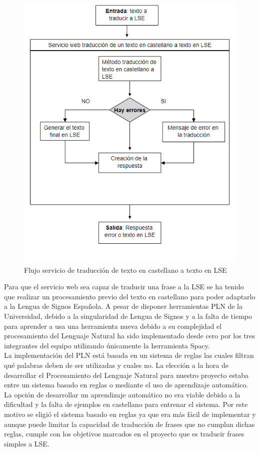 \begin{figure}[]
	\centering
	\includegraphics[width=1\textwidth]{Imagenes/Fuentes/Text2LSE/FlujoTextoLSE.png}
	\caption{ Flujo servicio de traducción de texto en castellano a texto en LSE }
	\label {fig: imgFlujoFlujoTextoLSE}
\end{figure}

Para que el servicio web sea capaz de traducir una frase a la LSE se ha tenido que realizar un procesamiento previo del texto en castellano para poder adaptarlo a la Lengua de Signos Española. A pesar de disponer herramientas PLN de la Universidad, debido a la singularidad de Lengua de Signos y a la falta de tiempo para aprender a usa una herramienta nueva debido a su complejidad el procesamiento del Lenguaje Natural ha sido implementado desde cero por los tres integrantes del equipo utilizando únicamente la herramienta Spacy. \\


La implementación del PLN está basada en un sistema de reglas las cuales filtran qué palabras deben de ser utilizadas y cuales no. La elección a la hora de desarrollar el Procesamiento del Lenguaje Natural para nuestro proyecto estaba entre un sistema basado en reglas o mediante el uso de aprendizaje automático. La opción de desarrollar un aprendizaje automático no era viable debido a la dificultad y la falta de ejemplos en castellano para entrenar el sistema. Por este motivo se eligió el sistema basado en reglas ya que era más fácil de implementar y aunque puede limitar la capacidad de traducción de frases que no cumplan dichas reglas, cumple con los objetivos marcados en el proyecto que es traducir frases simples a LSE.\\

